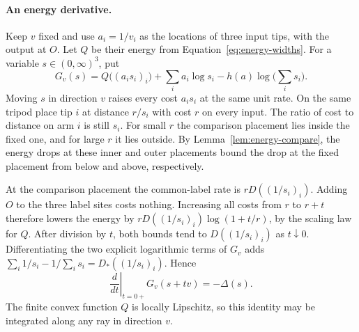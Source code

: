 \paragraph{An energy derivative.}
Keep $v$ fixed and use $a_i=1/v_i$ as the locations of three input
tips, with the output at $O$. Let $Q$ be their energy from
Equation~\eqref{eq:energy-widths}. For a variable
$s\in(0,\infty)^3$, put
\[
 G_v(s)=Q\big((a_i s_i)_i\big)+\sum_i a_i\log s_i
                   -h(a)\log\Big(\sum_i s_i\Big).
\]
Moving $s$ in direction $v$ raises every cost $a_i s_i$ at the same
unit rate. On the same tripod place tip $i$ at distance $r/s_i$
with cost $r$ on every input. The ratio of cost to distance on arm
$i$ is still $s_i$. For small $r$ the comparison placement lies
inside the fixed one, and for large $r$ it lies outside. By
Lemma~\ref{lem:energy-compare}, the energy drops at these inner and
outer placements bound the drop at the fixed placement from below
and above, respectively.

At the comparison placement the common-label rate is
$rD((1/s_i)_i)$. Adding $O$ to the three label sites costs nothing.
Increasing all costs from $r$ to $r+t$ therefore lowers the energy
by $rD((1/s_i)_i)\log(1+t/r)$, by the scaling law for $Q$.
After division by $t$, both bounds tend to $D((1/s_i)_i)$ as
$t\downarrow0$. Differentiating the two explicit logarithmic terms
of $G_v$ adds $\sum_i1/s_i-1/\sum_i s_i=D_*((1/s_i)_i)$. Hence
\begin{equation}\label{eq:src8}
       \left.\frac{d}{dt}\right|_{t=0+}G_v(s+tv)=-\Delta(s).
\end{equation}
The finite convex function $Q$ is locally Lipschitz, so this identity
may be integrated along any ray in direction $v$.

